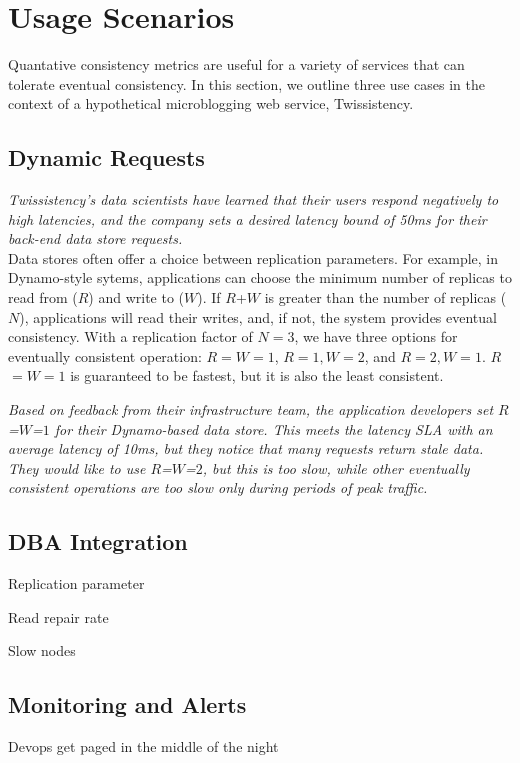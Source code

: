 \section{Usage Scenarios}
\label{sec:scenarios}

Quantative consistency metrics are useful for a variety of services
that can tolerate eventual consistency. In this section, we outline
three use cases in the context of a hypothetical microblogging web
service, Twissistency.

\subsection{Dynamic Requests}

\textit{Twissistency's data scientists have learned that their users
  respond negatively to high latencies, and the company sets a desired
  latency bound of 50ms for their back-end data store requests.}\\

Data stores often offer a choice between replication parameters. For
example, in Dynamo-style sytems, applications can choose the minimum
number of replicas to read from ($R$) and write to ($W$). If $R$+$W$
is greater than the number of replicas ($N$), applications will read
their writes, and, if not, the system provides eventual
consistency. With a replication factor of $N=3$, we have three options
for eventually consistent operation: $R$$=$$W$$=$$1$, $R$$=$$1$$,
W$$=$$2$, and $R$$=$$2$$, W$$=$$1$. $R$$=$$W$$=$$1$ is guaranteed to
be fastest, but it is also the least consistent.

\textit{Based on feedback from their infrastructure team, the
  application developers set $R$=$W$=$1$ for their Dynamo-based data
  store. This meets the latency SLA with an average latency of 10ms,
  but they notice that many requests return stale data. They would
  like to use $R$=$W$=$2$, but this is too slow, while other
  eventually consistent operations are too slow only during periods of
  peak traffic.}\\

\subsection{DBA Integration}

Replication parameter

Read repair rate

Slow nodes

\subsection{Monitoring and Alerts}

Devops get paged in the middle of the night
